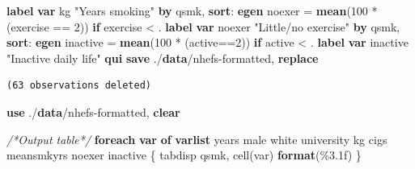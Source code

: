 \documentclass[
  10pt,
]{book}
\newenvironment{Shaded}{\begin{snugshade}}{\end{snugshade}}
\newcommand{\BaseNTok}[1]{\textcolor[rgb]{0.00,0.00,0.81}{#1}}
\newcommand{\CommentTok}[1]{\textcolor[rgb]{0.56,0.35,0.01}{\textit{#1}}}
\newcommand{\KeywordTok}[1]{\textcolor[rgb]{0.13,0.29,0.53}{\textbf{#1}}}
\newcommand{\NormalTok}[1]{#1}
\newcommand{\OtherTok}[1]{\textcolor[rgb]{0.56,0.35,0.01}{#1}}
\newcommand{\StringTok}[1]{\textcolor[rgb]{0.31,0.60,0.02}{#1}}
\begin{document}
\begin{Shaded}
\begin{Highlighting}[]
\KeywordTok{label} \KeywordTok{var}\NormalTok{ kg }\StringTok{"Years smoking"}
\KeywordTok{by}\NormalTok{ qsmk, }\KeywordTok{sort}\NormalTok{: }\KeywordTok{egen}\NormalTok{ noexer = }\KeywordTok{mean}\NormalTok{(100 * (exercise == 2)) }\KeywordTok{if}\NormalTok{ exercise \textless{} . }
\KeywordTok{label} \KeywordTok{var}\NormalTok{ noexer }\StringTok{"Little/no exercise"}
\KeywordTok{by}\NormalTok{ qsmk, }\KeywordTok{sort}\NormalTok{: }\KeywordTok{egen}\NormalTok{ inactive = }\KeywordTok{mean}\NormalTok{(100 * (active==2)) }\KeywordTok{if}\NormalTok{ active \textless{} . }
\KeywordTok{label} \KeywordTok{var}\NormalTok{ inactive }\StringTok{"Inactive daily life"}
\KeywordTok{qui} \KeywordTok{save}\NormalTok{ ./}\KeywordTok{data}\NormalTok{/nhefs{-}formatted, }\KeywordTok{replace}
\end{Highlighting}
\end{Shaded}

\begin{verbatim}
(63 observations deleted)
\end{verbatim}

\begin{Shaded}
\begin{Highlighting}[]
\KeywordTok{use}\NormalTok{ ./}\KeywordTok{data}\NormalTok{/nhefs{-}formatted, }\KeywordTok{clear}

\CommentTok{/*Output table*/}
\KeywordTok{foreach} \KeywordTok{var} \KeywordTok{of} \KeywordTok{varlist}\NormalTok{ years male  }\BaseNTok{white}\NormalTok{ university kg cigs meansmkyrs noexer inactive \{}
\NormalTok{  tabdisp qsmk, cell(}\OtherTok{\textasciigrave{}var\textquotesingle{}}\NormalTok{) }\KeywordTok{format}\NormalTok{(\%3.1f)}
\NormalTok{\}}
\end{Highlighting}
\end{Shaded}
\end{document}
